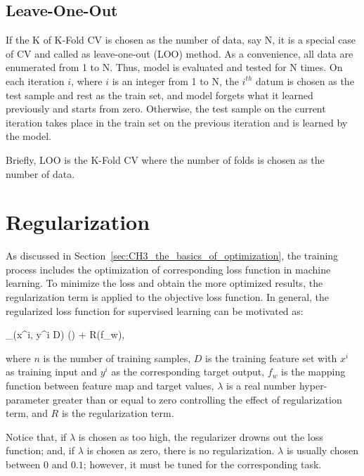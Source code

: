 \newpage

\subsection{Leave-One-Out}

If the K of K-Fold CV is chosen as the number of data, say N, it is a special case of CV and called as leave-one-out (LOO) method. As a convenience, all data are enumerated from 1 to N. Thus, model is evaluated and tested for N times. On each iteration $i$, where $i$ is an integer from 1 to N, the $i^{th}$ datum is chosen as the test sample and rest as the train set, and model forgets what it learned previously and starts from zero. Otherwise, the test sample on the current iteration takes place in the train set on the previous iteration and is learned by the model.

Briefly, LOO is the K-Fold CV where the number of folds is chosen as the number of data.

\section{Regularization}
\label{sec:CH5_regularization}

As discussed in Section~\ref{sec:CH3_the_basics_of_optimization}, the training process includes the optimization of corresponding loss function in machine learning. To minimize the loss and obtain the more optimized results, the regularization term is applied to the objective loss function. In general, the regularized loss function for supervised learning can be motivated as:

\be
\label{eq:general_regularized_loss}
\sum_{(x^{i}, y^{i} \in D)} \Big(\Big) + \lambda R(f_{w}), 
\ee

where $n$ is the number of training samples, $D$ is the training feature set with $x^{i}$ as training input and $y^{i}$ as the corresponding target output, $f_{w}$ is the mapping function between feature map and target values, $\lambda$ is a real number hyper-parameter greater than or equal to zero controlling the effect of regularization term, and $R$ is the regularization term. 

Notice that, if $\lambda$ is chosen as too high, the regularizer drowns out the loss function; and, if $\lambda$ is chosen as zero, there is no regularization. $\lambda$ is usually chosen between $0$ and $0.1$; however, it must be tuned for the corresponding task.

